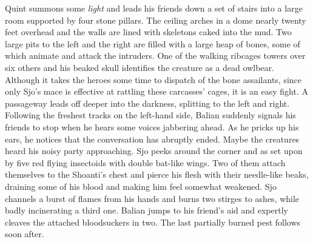 Quint summons some {\itshape light} and leads his friends down a set of stairs into a large room supported by four stone pillars. The ceiling arches in a dome nearly twenty feet overhead and the walls are lined with skeletons caked into the mud. Two large pits to the left and the right are filled with a large heap of bones, some of which animate and attack the intruders. One of the walking ribcages towers over six others and his beaked skull identifies the creature as a dead owlbear. Although it takes the heroes some time to dispatch of the bone assailants, since only Sjo's mace is effective at rattling these carcasses' cages, it is an easy fight. A passageway leads off deeper into the darkness, splitting to the left and right. Following the freshest tracks on the left-hand side, Balian suddenly signals his friends to stop when he hears some voices jabbering ahead. As he pricks up his ears, he notices that the conversation has abruptly ended. Maybe the creatures heard his noisy party approaching. Sjo peeks around the corner and as set upon by five red flying insectoids with double bat-like wings. Two of them attach themselves to the Shoanti's chest and pierce his flesh with their needle-like beaks, draining some of his blood and making him feel somewhat weakened. Sjo channels a burst of flames from his hands and burns two stirges to ashes, while badly incinerating a third one. Balian jumps to his friend's aid and expertly cleaves the attached bloodsuckers in two. The last partially burned pest follows soon after.\\

